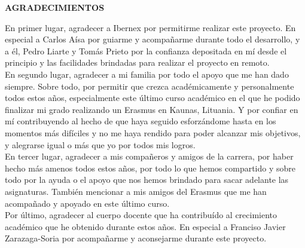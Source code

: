 \begin{center}
{\Large \bfseries AGRADECIMIENTOS}
\vspace{2.5cm}
\end{center}

En primer lugar, agradecer a Ibernex por permitirme realizar este proyecto. En especial a Carlos Aísa por guiarme y acompañarme durante todo el desarrollo, y a él, Pedro Liarte y Tomás Prieto por la confianza depositada en mí desde el principio y las facilidades brindadas para realizar el proyecto en remoto.\\

En segundo lugar, agradecer a mi familia por todo el apoyo que me han dado siempre. Sobre todo, por permitir que crezca académicamente y personalmente todos estos años, especialmente este último curso académico en el que he podido finalizar mi grado realizando un Erasmus en Kaunas, Lituania. Y por confiar en mí contribuyendo al hecho de que haya seguido esforzándome hasta en los momentos más difíciles y no me haya rendido para poder alcanzar mis objetivos, y alegrarse igual o más que yo por todos mis logros. \\

En tercer lugar, agradecer a mis compañeros y amigos de la carrera, por haber hecho más amenos todos estos años, por todo lo que hemos compartido y sobre todo por la ayuda o el apoyo que nos hemos brindado para sacar adelante las asignaturas. También mencionar a mis amigos del Erasmus que me han acompañado y apoyado en este último curso. \\

Por último, agradecer al cuerpo docente que ha contribuído al crecimiento académico que he obtenido durante estos años. En especial a Franciso Javier Zarazaga-Soria por acompañarme y aconsejarme durante este proyecto.